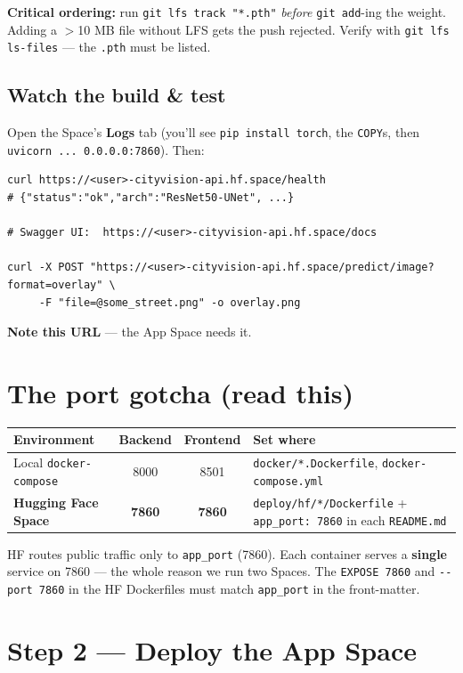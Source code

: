 \documentclass[11pt]{article}
\newcommand{\code}[1]{\lstinline[basicstyle=\ttfamily\normalsize]|#1|}
\begin{document}
\noindent\textbf{Critical ordering:} run \code{git lfs track "*.pth"}
\emph{before} \code{git add}-ing the weight. Adding a $>$10 MB file without LFS gets
the push rejected. Verify with \code{git lfs ls-files} --- the \code{.pth} must be
listed.

\subsection{Watch the build \& test}
Open the Space's \textbf{Logs} tab (you'll see \code{pip install torch}, the
\code{COPY}s, then \code{uvicorn ... 0.0.0.0:7860}). Then:
\begin{lstlisting}[style=block]
curl https://<user>-cityvision-api.hf.space/health
# {"status":"ok","arch":"ResNet50-UNet", ...}

# Swagger UI:  https://<user>-cityvision-api.hf.space/docs

curl -X POST "https://<user>-cityvision-api.hf.space/predict/image?format=overlay" \
     -F "file=@some_street.png" -o overlay.png
\end{lstlisting}
\textbf{Note this URL} --- the App Space needs it.

\section{The port gotcha (read this)}

\begin{tabularx}{\linewidth}{@{}Xccp{4.2cm}@{}}
\toprule
\textbf{Environment} & \textbf{Backend} & \textbf{Frontend} & \textbf{Set where} \\
\midrule
Local \code{docker-compose} & 8000 & 8501 & \code{docker/*.Dockerfile},
\code{docker-compose.yml} \\
\addlinespace
\textbf{Hugging Face Space} & \textbf{7860} & \textbf{7860} &
\code{deploy/hf/*/Dockerfile} + \code{app_port: 7860} in each \code{README.md} \\
\bottomrule
\end{tabularx}

\medskip
HF routes public traffic only to \code{app_port} (7860). Each container serves a
\textbf{single} service on 7860 --- the whole reason we run two Spaces. The
\code{EXPOSE 7860} and \code{--port 7860} in the HF Dockerfiles must match
\code{app_port} in the front-matter.

\section{Step 2 — Deploy the App Space}
\end{document}
